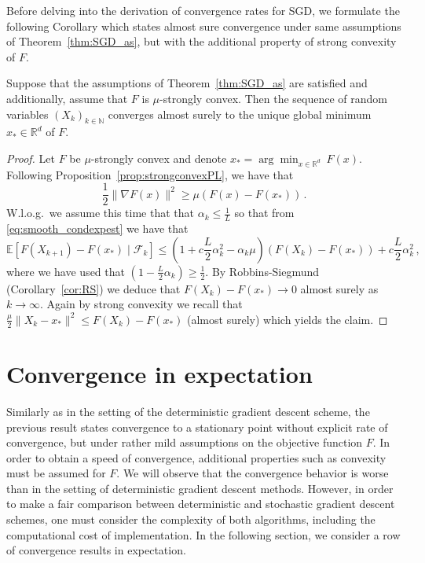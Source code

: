 \documentclass[12pt,openany]{book}
\theoremstyle{definition}
\theoremstyle{definition}
\newcommand{\cF}{\mathcal{F}}
\newcommand{\E}{\mathbb{E}}
\newcommand{\N}{\mathbb{N}}
\newcommand{\R}{\mathbb{R}}
\begin{document}
Before delving into the derivation of convergence rates for SGD, we formulate the following Corollary which states almost sure convergence under same assumptions of Theorem~\ref{thm:SGD_as}, but with the additional property of strong convexity of $F$. 

\begin{cor}\label{cor:SGD_as}
Suppose that the assumptions of Theorem~\ref{thm:SGD_as} are satisfied and additionally, assume that $F$ is $\mu$-strongly convex. Then the sequence of random variables $(X_k)_{k\in\N}$ converges almost surely to the unique global minimum $x_\ast\in\R^d$ of $F$.
\end{cor}
\begin{proof}
    Let $F$ be $\mu$-strongly convex and denote $x_\ast= \arg\min_{x\in\R^d}\ F(x)$. Following Proposition~\ref{prop:strongconvexPL}, we have that
    \[\frac12\|\nabla F(x)\|^2 \ge \mu(F(x)-F(x_\ast))\,.\]
    W.l.o.g.~we assume this time that that $\alpha_k\le \frac{1}{L}$ so that from \eqref{eq:smooth_condexpest} we have that
    \[\E[F(X_{k+1}) - F(x_\ast)\mid \cF_k] \le (1+c\frac{L}2\alpha_k^2 - \alpha_k\mu) (F(X_k)-F(x_\ast)) + c\frac{L}2\alpha_k^2\,,\]
    where we have used that $(1-\frac{L}2\alpha_k)\ge \frac12$. By Robbins-Siegmund (Corollary~\ref{cor:RS}) we deduce that $F(X_k)-F(x_\ast) \to 0$ almost surely as $k\to\infty$. Again by strong convexity we recall that $\frac{\mu}2\|X_k-x_\ast\|^2 \le F(X_k)-F(x_\ast)$ (almost surely) which yields the claim. 
\end{proof}



\section{Convergence in expectation}\label{sec:SGDexp}
Similarly as in the setting of the deterministic gradient descent scheme, the previous result states convergence to a stationary point without explicit rate of convergence, but under rather mild assumptions on the objective function $F$. In order to obtain a speed of convergence, additional properties such as convexity must be assumed for $F$. We will observe that the convergence behavior is worse than in the setting of deterministic gradient descent methods. However, in order to make a fair comparison between deterministic and stochastic gradient descent schemes, one must consider the complexity of both algorithms, including the computational cost of implementation.
In the following section, we consider a row of convergence results in expectation.
\end{document}
